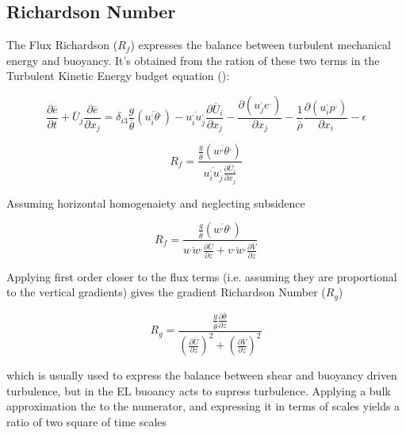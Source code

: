 \subsection{Richardson Number}
\label{}

The Flux Richardson ($R_{f}$) expresses the balance between turbulent mechanical energy and buoyancy.  It's obtained from the ration of these two terms
 in the Turbulent Kinetic Energy budget equation (\cite{Stull-BLMetIntro}):

\begin{equation}
\frac{\partial \overline{e}}{\partial t} + \overline{U}_{j} \frac{\partial \overline{e}}{\partial x_{j}} = \delta_{i3}  \frac{g}{\overline{\theta}} \left( \overline{u_{i}^{,}\theta^{,}} \right) - \overline{u_{i}^{,}u_{j}^{,}}\frac{\partial \overline{U}_{i}}{\partial x_{j}} - \frac{ \partial \left( u_{j}^{,}e^{,} \right)}{\partial x_{j}} - \frac{1}{\overline{\rho}} \frac{\partial \left( u_{i}^{,} p^{,} \right) }{\partial x_{i}} - \epsilon
\end{equation}

\begin{equation}
R_{f} = \frac{\frac{g}{\overline{\theta}} \left( \overline{w^{,}\theta^{,}} \right)}{\overline{u_{i}^{,}u_{j}^{,}}\frac{\partial \overline{U}_{i}}{\partial x_{j}}}
\end{equation}
 
Assuming horizontal homogenaiety and neglecting subsidence
  
\begin{equation}
R_{f} = \frac{\frac{g}{\overline{\theta}} \left( \overline{w^{,}\theta^{,}} \right)}{\overline{u^{,}w^{,}}\frac{\partial \overline{U}}{\partial z} + \overline{v^{,}w^{,}}\frac{\partial \overline{V}}{\partial z}}
\end{equation}

Applying first order closer to the flux terms (i.e. assuming they are proportional to the vertical gradients)  gives the gradient Richardson Number ($R_{g}$)

\begin{equation}
R_{g} = \frac{ \frac{g}{\overline{\theta}} \frac{\partial \overline{\theta}}{\partial z}}{\left( \frac{ \partial \overline{U}}{\partial z} \right)^{2} + \left( \frac{\partial \overline{V}}{\partial z} \right)^{2}} 
\end{equation}

which is usually used to express the balance between shear and buoyancy driven turbulence, but in the \acs{EL} buoancy acts to supress turbulence.  
Applying a bulk approximation the to the numerator, and expressing it in terms of scales yields a ratio of two square of time scales

